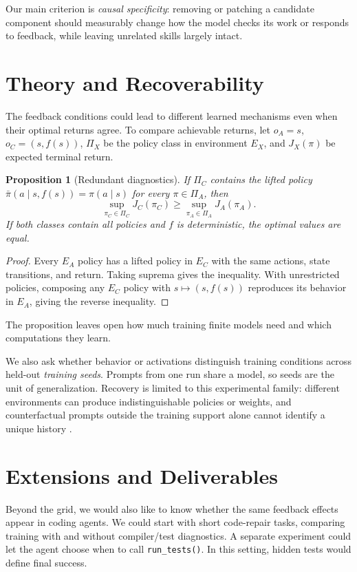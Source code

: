 \documentclass[11pt]{article}
\newtheorem{proposition}{Proposition}
\begin{document}
Our main criterion is \emph{causal specificity}: removing or patching a candidate component should measurably change how the model checks its work or responds to feedback, while leaving unrelated skills largely intact.

\section{Theory and Recoverability}
The feedback conditions could lead to different learned mechanisms even when their optimal returns agree. To compare achievable returns, let $o_A=s$, $o_C=(s,f(s))$, $\Pi_X$ be the policy class in environment $E_X$, and $J_X(\pi)$ be expected terminal return.
\begin{proposition}[Redundant diagnostics]
  If $\Pi_C$ contains the lifted policy $\bar\pi(a\mid s,f(s))=\pi(a\mid s)$ for every $\pi\in\Pi_A$, then
  \begin{equation}
    \sup_{\pi_C\in\Pi_C}J_C(\pi_C)\geq\sup_{\pi_A\in\Pi_A}J_A(\pi_A). \label{eq:redundant}
  \end{equation}
  If both classes contain all policies and $f$ is deterministic, the optimal values are equal.
\end{proposition}
\begin{proof}
  Every $E_A$ policy has a lifted policy in $E_C$ with the same actions, state transitions, and return. Taking suprema gives the inequality. With unrestricted policies, composing any $E_C$ policy with $s\mapsto(s,f(s))$ reproduces its behavior in $E_A$, giving the reverse inequality.
\end{proof}
The proposition leaves open how much training finite models need and which computations they learn.

We also ask whether behavior or activations distinguish training conditions across held-out \emph{training seeds}. Prompts from one run share a model, so seeds are the unit of generalization. Recovery is limited to this experimental family: different environments can produce indistinguishable policies or weights, and counterfactual prompts outside the training support alone cannot identify a unique history \cite{mousavi2026barrier}.

\section{Extensions and Deliverables}
Beyond the grid, we would also like to know whether the same feedback effects appear in coding agents. We could start with short code-repair tasks, comparing training with and without compiler/test diagnostics. A separate experiment could let the agent choose when to call \texttt{run\_tests()}. In this setting, hidden tests would define final success.
\end{document}
